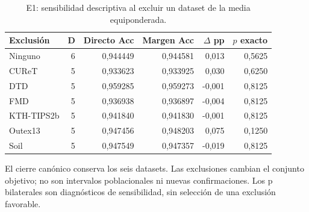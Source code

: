 \begin{table}[!htbp]\centering
\fontsize{8}{10}\selectfont\setlength{\tabcolsep}{4pt}
\caption{E1: sensibilidad descriptiva al excluir un dataset de la media equiponderada.}\label{tab:ars-e1-lodo}
\begin{tabular}{@{}lrrrrr@{}}\toprule
Exclusión & D & Directo Acc & Margen Acc & $\Delta$ pp & $p$ exacto\\\midrule
Ninguno & 6 & 0,944449 & 0,944581 & 0,013 & 0,5625\\
CUReT & 5 & 0,933623 & 0,933925 & 0,030 & 0,6250\\
DTD & 5 & 0,959285 & 0,959273 & -0,001 & 0,8125\\
FMD & 5 & 0,936938 & 0,936897 & -0,004 & 0,8125\\
KTH-TIPS2b & 5 & 0,941840 & 0,941830 & -0,001 & 0,8125\\
Outex13 & 5 & 0,947456 & 0,948203 & 0,075 & 0,1250\\
Soil & 5 & 0,947549 & 0,947357 & -0,019 & 0,8125\\
\bottomrule\end{tabular}
\par\smallskip\begin{minipage}{0.98\textwidth}\footnotesize El cierre canónico conserva los seis datasets. Las exclusiones cambian el conjunto objetivo; no son intervalos poblacionales ni nuevas confirmaciones. Los p bilaterales son diagnósticos de sensibilidad, sin selección de una exclusión favorable.\end{minipage}
\end{table}
